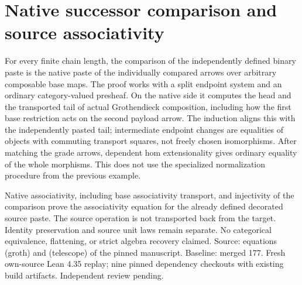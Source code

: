 \documentclass{article}
\begin{document}
\section*{Native successor comparison and source associativity}
For every finite chain length, the comparison of the independently defined binary paste is the native paste of the individually compared arrows over arbitrary composable base maps. The proof works with a split endpoint system and an ordinary category-valued presheaf. On the native side it computes the head and the transported tail of actual Grothendieck composition, including how the first base restriction acts on the second payload arrow. The induction aligns this with the independently pasted tail; intermediate endpoint changes are equalities of objects with commuting transport squares, not freely chosen isomorphisms. After matching the grade arrows, dependent hom extensionality gives ordinary equality of the whole morphisms. This does not use the specialized normalization procedure from the previous example.

Native associativity, including base associativity transport, and injectivity of the comparison prove the associativity equation for the already defined decorated source paste. The source operation is not transported back from the target. Identity preservation and source unit laws remain separate. No categorical equivalence, flattening, or strict algebra recovery claimed. Source: equations (groth) and (telescope) of the pinned manuscript. Baseline: merged 177. Fresh own-source Lean 4.35 replay; nine pinned dependency checkouts with existing build artifacts. Independent review pending.
\end{document}
